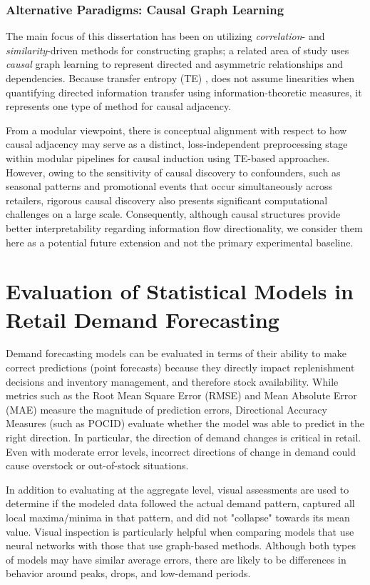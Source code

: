 \subsubsection{Alternative Paradigms: Causal Graph Learning} 
\label{sec:causal-graph-mts} 
The main focus of this dissertation has been on utilizing \textit{correlation}- and \textit{similarity}-driven methods for constructing graphs; a related area of study uses \textit{causal} graph learning to represent directed and asymmetric relationships and dependencies. Because transfer entropy (TE) \cite{febrinanto2025cgad}, \cite{duan2021caugnn} does not assume linearities when quantifying directed information transfer using information-theoretic measures, it represents one type of method for causal adjacency.

From a modular viewpoint, there is conceptual alignment with respect to how causal adjacency may serve as a distinct, loss-independent preprocessing stage within modular pipelines for causal induction using \ac{TE}-based approaches. However, owing to the sensitivity of causal discovery to confounders, such as seasonal patterns and promotional events that occur simultaneously across retailers, rigorous causal discovery also presents significant computational challenges on a large scale. Consequently, although causal structures provide better interpretability regarding information flow directionality, we consider them here as a potential future extension and not the primary experimental baseline.

\section{Evaluation of Statistical Models in Retail Demand Forecasting}\label{sec:sota_evaluation_retail}

Demand forecasting models can be evaluated in terms of their ability to make correct predictions (point forecasts) because they directly impact replenishment decisions and inventory management, and therefore stock availability. While metrics such as the Root Mean Square Error (RMSE) and Mean Absolute Error (MAE) measure the magnitude of prediction errors, Directional Accuracy Measures (such as POCID) evaluate whether the model was able to predict in the right direction. In particular, the direction of demand changes is critical in retail. Even with moderate error levels, incorrect directions of change in demand could cause overstock or out-of-stock situations.

In addition to evaluating at the aggregate level, visual assessments are used to determine if the modeled data followed the actual demand pattern, captured all local maxima/minima in that pattern, and did not "collapse" towards its mean value. Visual inspection is particularly helpful when comparing models that use neural networks with those that use graph-based methods. Although both types of models may have similar average errors, there are likely to be differences in behavior around peaks, drops, and low-demand periods.

